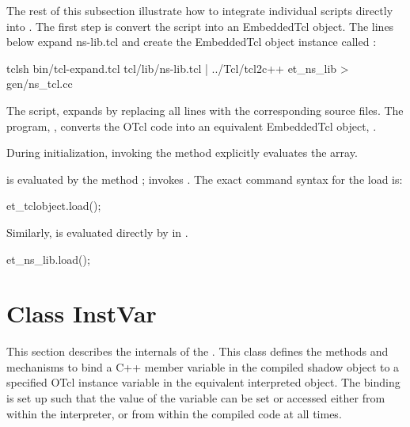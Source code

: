 The rest of this subsection illustrate
how to integrate individual scripts directly into \ns.
The first step is convert the script into an EmbeddedTcl object.
The lines below expand ns-lib.tcl and create the EmbeddedTcl object
instance called :
\begin{program}
        tclsh bin/tcl-expand.tcl tcl/lib/ns-lib.tcl | \bs
                               ../Tcl/tcl2c++ et_ns_lib > gen/ns_tcl.cc
\end{program}
The script, 
expands  by replacing all  lines
with the corresponding source files.
The program, ,
converts the OTcl code into an equivalent EmbeddedTcl object, .

During initialization, invoking the method 
explicitly evaluates the array.
\begin{list}{---}{}
\item
  is evaluated by the method
  ;
  invokes .
  The exact command syntax for the load is:
  \begin{program}
        et_tclobject.load();
  \end{program}
\item
  Similarly,
  is evaluated directly by  in .
  \begin{program}
        et_ns_lib.load();
  \end{program}
\end{list}

\section{Class InstVar}
\label{sec:InstVar}

This section describes the internals of the .
This class defines the methods and mechanisms to bind
a C++ member variable in the compiled shadow object
to a specified OTcl instance variable in the equivalent interpreted object.
The binding is set up such that the value of the variable can be
set or accessed either from within the interpreter, or from
within the compiled code at all times.

